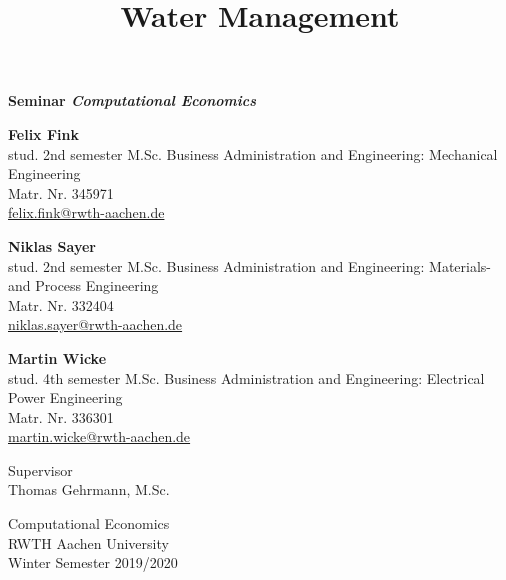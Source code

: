 \documentclass[12pt, a4paper, oneside]{article}
\title{Water Management}
\begin{document}
	\let\origref\ref %
	\let\ref\cref    %
	
	
	\begin{titlepage}
		\begin{center}
			\vspace*{1cm}
			
			\textbf{Seminar \textit{Computational Economics}}                
			
			\vspace{0.5cm}
			{\makeatletter{\@title}\makeatother}
			
			\vspace{1.5cm}
			
			\textbf{Felix Fink} \\
			stud. 2nd semester M.Sc. Business Administration and Engineering: Mechanical Engineering \\
			Matr. Nr. 345971 \\
			\href{mailto:felix.fink@rwth-aachen.de}{felix.fink@rwth-aachen.de} 
			
			\vspace{1cm}
			
			\textbf{Niklas Sayer} \\
			stud. 2nd semester M.Sc. Business Administration and Engineering: Materials- and Process Engineering\\
			Matr. Nr. 332404 \\
			\href{mailto:niklas.sayer@rwth-aachen.de}{niklas.sayer@rwth-aachen.de} 
			
			\vspace{1cm}
			
			\textbf{Martin Wicke} \\
			stud. 4th semester M.Sc. Business Administration and Engineering: Electrical Power Engineering\\
			Matr. Nr. 336301 \\
			\href{mailto:martin.wicke@rwth-aachen.de}{martin.wicke@rwth-aachen.de} 
			
			\vfill
			
			
			Supervisor\\
			Thomas Gehrmann, M.Sc.
			
			\vspace{0.8cm}
			
			
			Computational Economics\\
			RWTH Aachen University\\
			Winter Semester 2019/2020
			
		\end{center}
	\end{titlepage}
\end{document}

